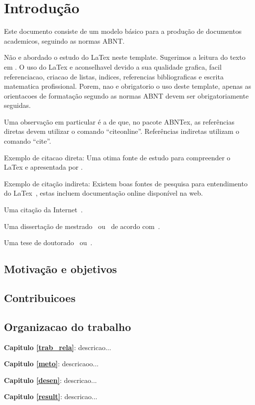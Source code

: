 \chapter{Introdução}\label{CAP:introducao}

\noindent Este documento consiste de um modelo básico para a produção de documentos academicos, seguindo as normas ABNT. 

Não e abordado o estudo do LaTex neste template. Sugerimos a leitura do texto em . O uso do LaTex e aconselhavel devido a sua qualidade grafica, facil referenciacao,
 criacao de listas, indices, referencias bibliograficas e escrita matematica profissional. Porem, nao e obrigatorio o uso deste template, apenas as orientacoes de formatação segundo as normas ABNT devem ser obrigatoriamente seguidas.

Uma observação em particular é a de que, no pacote ABNTex, as referências diretas devem utilizar o comando ``citeonline''. Referências indiretas utilizam o comando ``cite''.

Exemplo de citacao direta: Uma otima fonte de estudo para compreender o LaTex e apresentada por . 

Exemplo de citação indireta: Existem boas fontes de pesquisa para entendimento do LaTex~\cite{Oetiker:1995,radke:2005}, estas incluem documentação online disponível na web.

Uma citação da Internet~\cite{cil:2016,phdthesis:2011}.

Uma dissertação de mestrado~\cite{mastersthesis:93} ou~ de acordo com~.

Uma tese de doutorado~\cite{phdthesis:2011} ou~.

\section{Motivação e objetivos}


 
\section{Contribuicoes}




\section{Organizacao do trabalho}

\noindent \textbf{Capitulo \ref{trab_rela}}: descricao...

\noindent \textbf{Capitulo \ref{meto}}: descricaoo...

\noindent \textbf{Capitulo \ref{desen}}: descricao...

\noindent \textbf{Capitulo \ref{result}}: descricao...